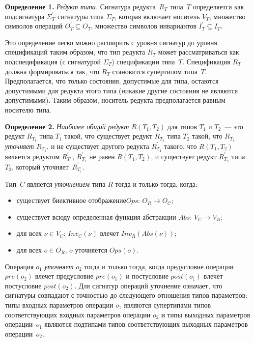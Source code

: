 \begin{multicols}{2}
\medskip

\noindent
\textbf{Определение 1.} \textit{Редукт типа.} Сигнатура редукта~$R_T$ типа~$T$
определяется как подсигнатура $\Sigma_T^\prime$ сигнатуры типа $\Sigma_T$, которая
включает носитель $V_T$, множество символов операций $O^\prime_T \subseteq O_T$,
множество символов инвариантов $I^\prime_T \subseteq I_T$.
\vspace*{3pt}

     Это определение легко можно расширить с уровня сигнатур до уровня
спецификаций таким образом, что тип редукта $R_T$ может рассматриваться как
подспецификация (с сигнатурой $\Sigma_T$) спецификации типа~$T$. Спецификация
$R_T$ должна формироваться так, что $R_T$ становится супертипом типа~$T$.
Предполагается, что только состояния, допустимые для типа, остаются допустимыми для
редукта этого типа (никакие другие состояния не являются допустимыми). Таким образом,
носитель редукта предполагается равным носителю типа.

\medskip

\noindent
\textbf{Определение 2.} \textit{Наиболее общий редукт} $R(T_1,T_2)$ для типов
$T_1$ и $T_2$~--- это редукт $R_{T_1}$ типа $T_1$ такой, что существует редукт
$R_{T_2}$ типа $T_2$ такой, что $R_{T_2}$ \textit{уточняет} $R_{T_1}$, и не существует
другого редукта $R_{T_1}^\prime$ такого, что $R (T_1,T_2)$ является редуктом
$R^\prime_{T_1}$, $R^\prime_{T_1}$ не равен $R(T_1,T_2)$, и существует редукт
$R^\prime_{T_2}$ типа $T_2$, который уточняет~$R^\prime_{T_1}$.
\vspace*{3pt}

     Тип~$C$ является \textit{уточнением} типа $R$ тогда и только тогда, когда:
     \begin{itemize}
\item существует биективное отображение\newline $Ops$:\;  $O_R \rightarrow O_C$;
\item существует всюду определенная функция абстракции $Abs$:\; $ V_C \rightarrow V_R$;
\item для всех $\nu \in {V_C}$:\; $Inv_C(\nu)$ влечет $Inv_R(Abs(\nu ))$;
\item для всех $o\in {O_R}$,\; $o$ уточняется $Ops(o)$.
\end{itemize}

     Операция $o_1$ \textit{уточняет} $o_2$ тогда и только тогда, когда пред\-усло\-вие
операции $pre(o_2)$ влечет пред\-усло\-вие $pre(o_1)$ и пост\-усло\-вие $post(o_1)$ влечет
пост\-усло\-вие $post(o_2)$. Для сигнатур операций уточнение означает, что сигнатуры
совпадают с точ\-ностью до следующего отношения типов параметров: типы входных
па\-ра\-мет\-ров операции $o_1$ являются супертипами типов соответствующих входных
па\-ра\-мет\-ров операции $o_2$ и типы выходных па\-ра\-мет\-ров %
операции~$o_1$ являются
подтипами типов со\-от\-вет\-ст\-ву\-ющих выходных па\-ра\-мет\-ров операции~$o_2$.


\end{multicols}
